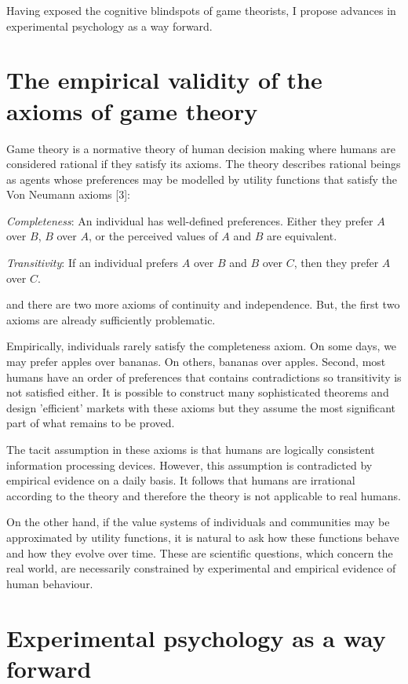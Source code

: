 \documentclass{article}
\begin{document}
	Having exposed the cognitive blindspots of game theorists, I propose advances in experimental psychology as a way forward. 

\newpage

\section{The empirical validity of the axioms of game theory}

Game theory is a normative theory of human decision making where humans are considered rational if they satisfy its axioms. The theory describes rational beings as agents whose preferences may be modelled by utility functions that satisfy the Von Neumann axioms [3]: 

\textit{Completeness}: An individual has well-defined preferences. Either they prefer $A$ over $B$, $B$ over $A$, or the perceived values of $A$ and $B$ are equivalent. 

\textit{Transitivity}: If an individual prefers $A$ over $B$ and $B$ over $C$, then they prefer $A$ over $C$. 

and there are two more axioms of continuity and independence. But, the first two axioms are already sufficiently problematic. 

Empirically, individuals rarely satisfy the completeness axiom. On some days, we may prefer apples over bananas. On others, bananas over apples. Second, most humans have an order of preferences that contains contradictions so transitivity is not satisfied either. It is possible to construct many sophisticated theorems and design 'efficient' markets with these axioms but they assume the most significant part of what remains to be proved. 

The tacit assumption in these axioms is that humans are logically consistent information processing devices. However, this assumption is contradicted by
empirical evidence on a daily basis. It follows that humans are irrational according to the theory and therefore the theory is not applicable to real humans. 

On the other hand, if the value systems of individuals and communities may be approximated by utility functions, it is natural to ask how these functions behave and how they evolve over time. These are scientific questions, which concern the real world, are necessarily constrained by experimental and empirical evidence of human behaviour. 

\section{Experimental psychology as a way forward}
\end{document}
